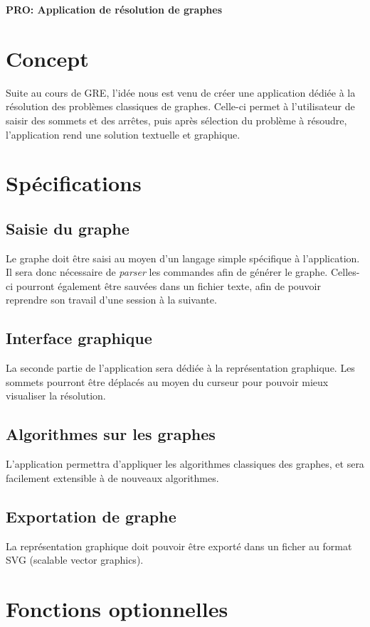 \documentclass[french]{article}
\begin{document}
	\centering
	\large{\textbf{PRO: Application de résolution de graphes}}
	
	\justify
	
	\section{Concept}
		Suite au cours de GRE, l'idée nous est venu de créer une application dédiée à la résolution des problèmes classiques de graphes. Celle-ci permet à l'utilisateur de saisir des sommets et des arrêtes, puis après sélection du problème à résoudre, l'application rend une solution textuelle et graphique.
		
	\section{Spécifications}
		\subsection{Saisie du graphe}
			Le graphe doit être saisi au moyen d'un langage simple spécifique à l'application. Il sera donc nécessaire de \textit{parser} les commandes afin de générer le graphe. Celles-ci pourront également être sauvées dans un fichier texte, afin de pouvoir reprendre son travail d'une session à la suivante.
		
		\subsection{Interface graphique}
			La seconde partie de l'application sera dédiée à la représentation graphique. Les sommets pourront être déplacés au moyen du curseur pour pouvoir mieux visualiser la résolution.
			
		\subsection{Algorithmes sur les graphes}
			L'application permettra d'appliquer les algorithmes classiques des graphes, et sera facilement extensible à de nouveaux algorithmes. 
		
		\subsection{Exportation de graphe}
			La représentation graphique doit pouvoir être exporté dans un ficher au format SVG (scalable vector graphics).
		
	\section{Fonctions optionnelles}
\end{document}
